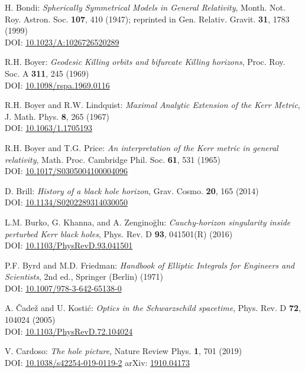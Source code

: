 \begin{thebibliography}{123}
H. Bondi:
{\em Spherically Symmetrical Models in General Relativity},
Month. Not. Roy. Astron. Soc. {\bf 107}, 410 (1947);
reprinted in
Gen. Relativ. Gravit. {\bf 31}, 1783 (1999)\\
DOI: \href{https://doi.org/10.1023/10.1023/A:1026726520289}{10.1023/A:1026726520289}

R.H. Boyer: {\em Geodesic Killing orbits and bifurcate Killing horizons},
Proc. Roy. Soc. A {\bf 311}, 245 (1969)\\
DOI: \href{https://doi.org/10.1098/rspa.1969.0116}{10.1098/rspa.1969.0116}

R.H. Boyer and R.W. Lindquist: {\em Maximal Analytic Extension of the Kerr Metric},
J. Math. Phys. {\bf 8}, 265 (1967)\\
DOI: \href{https://doi.org/10.1063/1.1705193}{10.1063/1.1705193}

R.H. Boyer and T.G. Price: {\em An interpretation of the Kerr metric in general relativity},
Math. Proc. Cambridge Phil. Soc. {\bf 61}, 531 (1965)\\
DOI: \href{https://doi.org/10.1017/S0305004100004096}{10.1017/S0305004100004096}

D. Brill: {\em History of a black hole horizon},
Grav. Cosmo. {\bf 20}, 165 (2014) \\
DOI: \href{https://doi.org/10.1134/S0202289314030050}{10.1134/S0202289314030050}

L.M. Burko, G. Khanna, and A. Zenginoğlu: {\em
Cauchy-horizon singularity inside perturbed Kerr black holes},
Phys. Rev. D {\bf 93}, 041501(R) (2016) \\
DOI: \href{https://doi.org/10.1103/PhysRevD.93.041501}{10.1103/PhysRevD.93.041501}

P.F. Byrd and M.D. Friedman:
{\em Handbook of Elliptic Integrals for Engineers and Scientists},
2nd ed., Springer (Berlin) (1971)\\
DOI: \href{https://doi.org/10.1007/978-3-642-65138-0}{10.1007/978-3-642-65138-0}

A. \v{C}ade\v{z} and U. Kosti\'c:
{\em Optics in the Schwarzschild spacetime},
Phys. Rev. D {\bf 72}, 104024 (2005)\\
DOI: \href{https://doi.org/10.1103/PhysRevD.72.104024}{10.1103/PhysRevD.72.104024}

V. Cardoso:
{\em The hole picture},
Nature Review Phys. {\bf 1}, 701 (2019)\\
DOI: \href{https://doi.org/10.1038/s42254-019-0119-2}{10.1038/s42254-019-0119-2}\hfill
arXiv: \href{https://arxiv.org/abs/1910.04173}{1910.04173}


\end{thebibliography}

